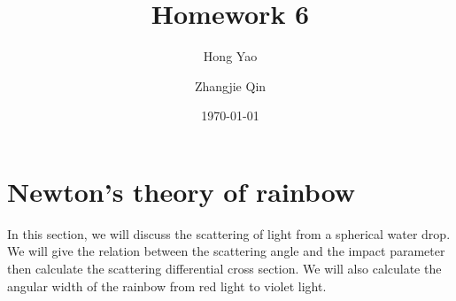 \documentclass[%
 reprint,
 amsmath,amssymb,
 aps,
]{revtex4-1}
\begin{document}
\title{Homework 6}%


\author{Hong Yao}
\author{Zhangjie Qin}
%
\date{\today}

\maketitle


\section{Newton's theory of rainbow}
In this section, we will discuss the scattering of light from a spherical water drop. We will give the relation between the scattering angle and the impact parameter then calculate the scattering differential cross section. We will also calculate the angular width of the rainbow from red light to violet light.
\end{document}
